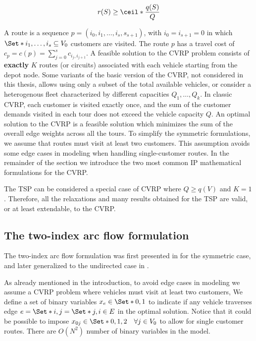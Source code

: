 \begin{equation}
	r(S) \ge \ceil*{\frac{q(S)}{Q}}
\end{equation}

A route is a sequence $p = (i_0, i_1, \dots, i_s, s_{s+1})$, with $i_0 = i_{s + 1} = 0$ in which
$\Set*{i_1, \dots, i_s} \subseteq V_0$ customers are visited.
The route $p$ has a travel cost of $c_p = c(p) = \sum_{j=0}^s c_{i_j,i_{j+1}}$.
A feasible solution to the CVRP problem consists of \textbf{exactly} $K$ routes (or circuits) associated with each vehicle starting from the depot node.
Some variants of the basic version of the CVRP, not considered in this thesis, allows using only a subset of the total available vehicles,
or consider a heterogenous fleet characterized by different capacities $Q_1, \dots, Q_k$.
In classic CVRP, each customer is visited exactly once, and the sum of the customer demands visited in each tour does not exceed the vehicle capacity $Q$.
An optimal solution to the CVRP is a feasible solution which minimizes the sum of the overall edge weights across all the tours.
To simplify the symmetric formulations, we assume that routes must visit at least two customers.
This assumption avoids some edge cases in modeling when handling single-customer routes.
In the remainder of the section we introduce the two most common IP mathematical formulations for the CVRP.

The TSP can be considered a special case of CVRP where $Q \ge q(V)$ and $K = 1$.
Therefore, all the relaxations and many results obtained for the TSP are valid, or at least extendable, to the CVRP.

\subsection{The two-index arc flow formulation}
\label{sec:intro-cvrp-two-index-flow-formulation}

The two-index arc flow formulation was first presented in \cite{laporte1983, laporte1985} for the symmetric case,
and later generalized to the undirected case in \cite{laporte1986}.

As already mentioned in the introduction,
to avoid edge cases in modeling we assume a CVRP problem where
vehicles must visit at least two customers,
We define a set of binary variables $x_e \in \Set*{0, 1}$ to indicate if any vehicle traverses
edge $e = \Set*{i, j} = \Set*{j, i} \in E$ in the optimal solution.
Notice that it could be possible to impose $x_{0j} \in \Set*{0, 1, 2} \quad \forall j \in V_0$
to allow for single customer routes.
There are $O(N^2)$ number of binary variables in the model.

